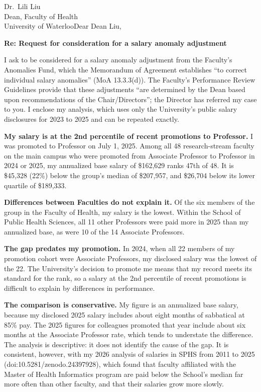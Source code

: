 \begin{aprletter}{%
Dr.\ Lili Liu\\
Dean, Faculty of Health\\
University of Waterloo}{Dear Dean Liu,}

\textbf{Re: Request for consideration for a salary anomaly adjustment}

I ask to be considered for a salary anomaly adjustment from the Faculty's Anomalies Fund, which the Memorandum of Agreement establishes ``to correct individual salary anomalies'' (MoA 13.3.3(d)). The Faculty's Performance Review Guidelines provide that these adjustments ``are determined by the Dean based upon recommendations of the Chair/Directors''; the Director has referred my case to you. I enclose my analysis, which uses only the University's public salary disclosures for 2023 to 2025 and can be repeated exactly.

\textbf{My salary is at the 2nd percentile of recent promotions to Professor.} I was promoted to Professor on July 1, 2025. Among all 48 research-stream faculty on the main campus who were promoted from Associate Professor to Professor in 2024 or 2025, my annualized base salary of \$162,629 ranks 47th of 48. It is \$45,328 (22\%) below the group's median of \$207,957, and \$26,704 below its lower quartile of \$189,333.

\textbf{Differences between Faculties do not explain it.} Of the six members of the group in the Faculty of Health, my salary is the lowest. Within the School of Public Health Sciences, all 11 other Professors were paid more in 2025 than my annualized base, as were 10 of the 14 Associate Professors.

\textbf{The gap predates my promotion.} In 2024, when all 22 members of my promotion cohort were Associate Professors, my disclosed salary was the lowest of the 22. The University's decision to promote me means that my record meets its standard for the rank, so a salary at the 2nd percentile of recent promotions is difficult to explain by differences in performance.

\textbf{The comparison is conservative.} My figure is an annualized base salary, because my disclosed 2025 salary includes about eight months of sabbatical at 85\% pay. The 2025 figures for colleagues promoted that year include about six months at the Associate Professor rate, which tends to understate the difference. The analysis is descriptive: it does not identify the cause of the gap. It is consistent, however, with my 2026 analysis of salaries in SPHS from 2011 to 2025 (doi:10.5281/zenodo.24397928), which found that faculty affiliated with the Master of Health Informatics program are paid below the School's median far more often than other faculty, and that their salaries grow more slowly.


\end{aprletter}
